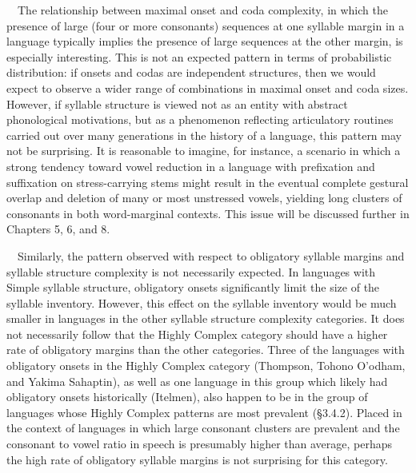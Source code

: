 \documentclass[12pt]{article}
\newenvironment{styleBody}{\renewcommand\baselinestretch{1.0}\setlength\leftskip{0in}\setlength\rightskip{0in plus 1fil}\setlength\parindent{0in}\setlength\parfillskip{0pt plus 1fil}\setlength\parskip{0in plus 1pt}\writerlistparindent\writerlistleftskip\leavevmode\normalfont\normalsize\fontsize{11pt}{13.2pt}\selectfont\mdseries\upshape\writerlistlabel\ignorespaces}{\unskip\vspace{0in plus 1pt}\par}
\newcommand\writerlistleftskip{}
\newcommand\writerlistparindent{}
\newcommand\writerlistlabel{}
\begin{document}
\begin{styleBody}
\ \ The relationship between maximal onset and coda complexity, in which the presence of large (four or more consonants) sequences at one syllable margin in a language typically implies the presence of large sequences at the other margin, is especially interesting. This is not an expected pattern in terms of probabilistic distribution: if onsets and codas are independent structures, then we would expect to observe a wider range of combinations in maximal onset and coda sizes. However, if syllable structure is viewed not as an entity with abstract phonological motivations, but as a phenomenon reflecting articulatory routines carried out over many generations in the history of a language, this pattern may not be surprising. It is reasonable to imagine, for instance, a scenario in which a strong tendency toward vowel reduction in a language with prefixation and suffixation on stress-carrying stems might result in the eventual complete gestural overlap and deletion of many or most unstressed vowels, yielding long clusters of consonants in both word-marginal contexts. This issue will be discussed further in Chapters 5, 6, and 8.
\end{styleBody}

\begin{styleBody}
\ \ Similarly, the pattern observed with respect to obligatory syllable margins and syllable structure complexity is not necessarily expected. In languages with Simple syllable structure, obligatory onsets significantly limit the size of the syllable inventory. However, this effect on the syllable inventory would be much smaller in languages in the other syllable structure complexity categories. It does not necessarily follow that the Highly Complex category should have a higher rate of obligatory margins than the other categories. Three of the languages with obligatory onsets in the Highly Complex category (Thompson, Tohono O’odham, and Yakima Sahaptin), as well as one language in this group which likely had obligatory onsets historically (Itelmen), also happen to be in the group of languages whose Highly Complex patterns are most prevalent (§3.4.2). Placed in the context of languages in which large consonant clusters are prevalent and the consonant to vowel ratio in speech is presumably higher than average, perhaps the high rate of obligatory syllable margins is not surprising for this category.
\end{styleBody}
\end{document}
